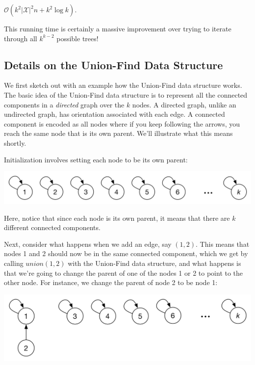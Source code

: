 {\centering$\mathcal{O}(k^{2}|\mathcal{X}|^{2}n+k^{2}\log k).$ \par}
 
This running time is certainly a massive improvement over trying to iterate through all $k^{k-2}$ possible trees!

\subsection{Details on the Union-Find Data Structure}

We first sketch out with an example how the Union-Find data structure works. The basic idea of the Union-Find data structure is to represent all the connected components in a \textit{directed} graph over the $k$ nodes. A directed graph, unlike an undirected graph, has orientation associated with each edge. A connected component is encoded as all nodes where if you keep following the arrows, you reach the same node that is its own parent. We'll illustrate what this means shortly.

Initialization involves setting each node to be its own parent:

{\centering\includegraphics[scale=0.4]{images_union-find1} \par}

Here, notice that since each node is its own parent, it means that there are $k$ different connected components.

Next, consider what happens when we add an edge, say $(1,2)$. This means that nodes 1 and 2 should now be in the same connected component, which we get by calling $union(1,2)$ with the Union-Find data structure, and what happens is that we're going to change the parent of one of the nodes 1 or 2 to point to the other node. For instance, we change the parent of node 2 to be node 1:

{\centering\includegraphics[scale=0.4]{images_union-find2} \par}


